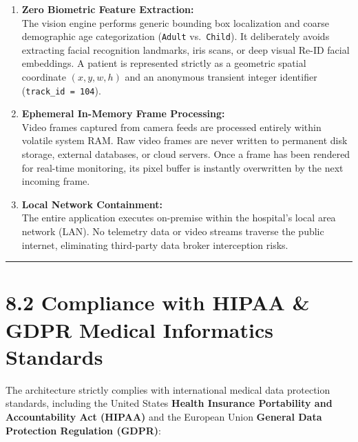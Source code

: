 \begin{enumerate}
\def\labelenumi{\arabic{enumi}.}
\tightlist
\item
  \textbf{Zero Biometric Feature Extraction:}\\
  The vision engine performs generic bounding box localization and
  coarse demographic age categorization (\texttt{Adult}
  vs.~\texttt{Child}). It deliberately avoids extracting facial
  recognition landmarks, iris scans, or deep visual Re-ID facial
  embeddings. A patient is represented strictly as a geometric spatial
  coordinate \((x, y, w, h)\) and an anonymous transient integer
  identifier (\texttt{track\_id\ =\ 104}).
\item
  \textbf{Ephemeral In-Memory Frame Processing:}\\
  Video frames captured from camera feeds are processed entirely within
  volatile system RAM. Raw video frames are never written to permanent
  disk storage, external databases, or cloud servers. Once a frame has
  been rendered for real-time monitoring, its pixel buffer is instantly
  overwritten by the next incoming frame.
\item
  \textbf{Local Network Containment:}\\
  The entire application executes on-premise within the hospital's local
  area network (LAN). No telemetry data or video streams traverse the
  public internet, eliminating third-party data broker interception
  risks.
\end{enumerate}

\begin{center}\rule{0.5\linewidth}{0.5pt}\end{center}

\section{8.2 Compliance with HIPAA \& GDPR Medical Informatics
Standards}\label{compliance-with-hipaa-gdpr-medical-informatics-standards}

The architecture strictly complies with international medical data
protection standards, including the United States \textbf{Health
Insurance Portability and Accountability Act (HIPAA)} and the European
Union \textbf{General Data Protection Regulation (GDPR)}:

